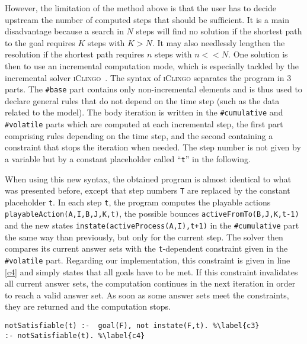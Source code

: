 However, the limitation of the method above is that the user has to decide upstream
the number of computed steps that should be sufficient.
It is a main disadvantage because a search in $N$ steps will find no solution
if the shortest path to the goal requires $K$ steps with $K > N$.
It may also needlessly lengthen the resolution if the shortest path requires $n$ steps with $n << N$.
One solution is then to use an incremental computation mode,
which is especially tackled by the incremental solver \textsc{iClingo}~\cite{gebser2008user}.
The syntax of \textsc{iClingo} separates the program in 3 parts.
The \texttt{\#base} part contains only non-incremental elements
and is thus used to declare general rules
that do not depend on the time step (such as the data related to the model).
The body iteration is written in the
\texttt{\#cumulative} and \texttt{\#volatile} parts
which are computed at each incremental step,
the first part comprising rules depending on the time step,
and the second containing a constraint that stops the iteration when needed.
The step number is not given by a variable but by a constant placeholder
called “\texttt{t}” in the following.

When using this new syntax, the obtained program is almost identical
to what was presented before,
except that step numbers \texttt{T}
are replaced by the constant placeholder \texttt{t}.
In each step \texttt{t}, the program computes the playable actions \texttt{playableAction(A,I,B,J,K,t)}, the possible bounces \texttt{activeFromTo(B,J,K,t-1)}
and the new states \texttt{instate(activeProcess(A,I),t+1)}
in the \texttt{\#cumulative} part
the same way than previously, but only for the current step.
The solver then compares its current answer sets with
the \texttt{t}-dependent constraint given in the \texttt{\#volatile} part.
Regarding our implementation, this constraint is given in line \ref{c4}
and simply states that all goals have to be met.
If this constraint invalidates all current answer sets,
the computation continues in the next iteration in order to reach a valid answer set.
As soon as some answer sets meet the constraints,
they are returned and the computation stops.
\begin{lstlisting}
notSatisfiable(t) :-  goal(F), not instate(F,t). %\label{c3}
:- notSatisfiable(t). %\label{c4}
\end{lstlisting}
